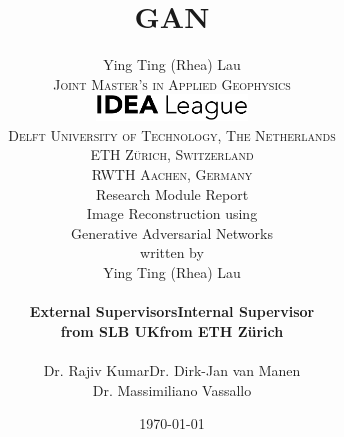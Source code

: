 \documentclass{report}
\begin{document}
\title{GAN}
\author{Ying Ting (Rhea) Lau
\date{\today}

\begin{titlepage}

\begin{center}
\textsc{ \LARGE{Joint Master's in Applied Geophysics\\}}
\vspace{10mm}
\includegraphics[width=0.3\textwidth]{Figure/Front_page/IDEA_League_Logo.png}
\vspace{5mm}\\
\textsc{ \large{Delft University of Technology, The Netherlands\\ }}
\textsc{ \large{ETH Zürich, Switzerland\\ }}
\textsc{ \large{RWTH Aachen, Germany\\ }}
\vspace{25mm}
\textnormal{ \LARGE{Research Module Report\\}}
\vspace{5mm}
\textnormal{\huge{Image Reconstruction using \\Generative Adversarial Networks\\}}
\vspace{5mm}
\textnormal{\large{written by\\}}
\textnormal{\Large{Ying Ting (Rhea) Lau\\}}
\vspace{25mm}
\setlength{\columnsep}{500pt}
\begin{tabular}{cccc}
\textbf{\large{External Supervisors}} & & & \textbf{\large{Internal Supervisor}} \\
\textbf{\large{from SLB UK}} & & & \textbf{\large{from ETH Zürich}} \\\\
\large{Dr. Rajiv Kumar} & & & \large{Dr. Dirk-Jan van Manen} \\
\large{Dr. Massimiliano Vassallo} &  \\
\end{tabular}
\end{center}

\vspace{20mm}

\end{titlepage}

}
\end{document}
